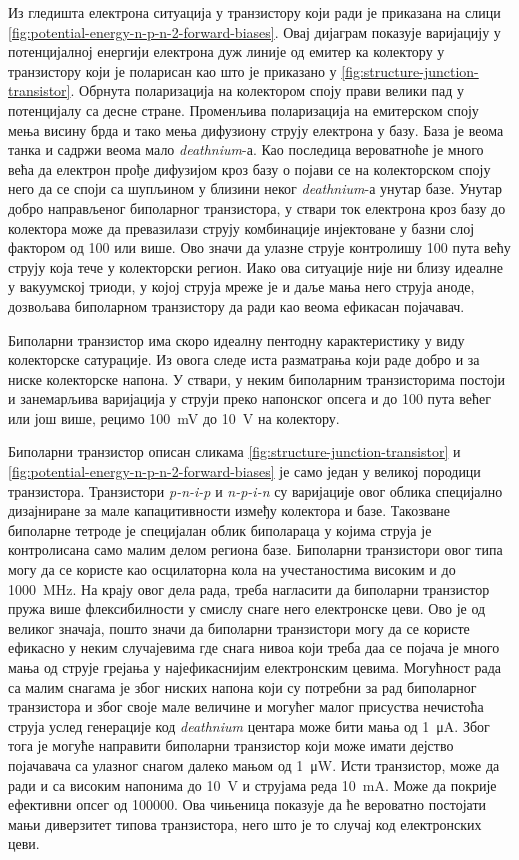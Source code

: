 \documentclass{article}
\begin{document}
Из гледишта електрона ситуација у транзистору који ради је приказана на слици \ref{fig:potential-energy-n-p-n-2-forward-biases}. Овај дијаграм показује варијацију у потенцијалној енергији електрона дуж линије од емитер ка колектору у транзистору који је поларисан као што је приказано у \ref{fig:structure-junction-transistor}. Обрнута поларизација на колектором споју прави велики пад у потенцијалу  са десне стране. Променљива поларизација на емитерском споју мења висину брда и тако мења дифузиону струју електрона у базу. База је веома танка и садржи веома мало \textit{deathnium}-а. Као последица вероватноће је много већа да електрон прође дифузијом кроз базу о појави се на колекторском споју него да се споји са шупљином у близини неког \textit{deathnium}-а унутар базе. Унутар добро направљеног биполарног транзистора, у ствари ток електрона кроз базу до колектора може да превазилази струју комбинације инјектоване у базни слој фактором од 100 или више. Ово значи да улазне струје контролишу 100 пута већу струју која тече у колекторски регион. Иако ова ситуације није ни близу идеалне у вакуумској триоди, у којој струја мреже је и даље мања него струја аноде, дозвољава биполарном транзистору да ради као веома ефикасан појачавач.

Биполарни транзистор има скоро идеалну пентодну карактеристику у виду колекторске сатурације. Из овога следе иста разматрања који раде добро и за ниске колекторске напона. У ствари, у неким биполарним транзисторима постоји и занемарљива варијација у струји преко напонског опсега и до 100 пута већег или још више, рецимо \SI{100}{\milli\volt} до \SI{10}{\volt} на колектору. 

Биполарни транзистор описан сликама \ref{fig:structure-junction-transistor} и \ref{fig:potential-energy-n-p-n-2-forward-biases} је само један у великој породици транзистора. Транзистори \textit{p-n-i-p} и \textit{n-p-i-n} су варијације овог облика специјално дизајниране за мале капацитивности између колектора и базе. Такозване биполарне тетроде је специјалан облик биполараца у којима струја је контролисана само малим делом региона базе. Биполарни транзистори овог типа могу да се користе као осцилаторна кола на учестаностима високим и до \SI{1000}{\mega\hertz}. На крају овог дела рада, треба нагласити да биполарни транзистор пружа више флексибилности у смислу снаге него електронске цеви. Ово је од великог значаја, пошто значи да биполарни транзистори могу да се користе ефикасно у неким случајевима где снага нивоа који треба даа се појача је много мања од струје грејања у најефикаснијим електронским цевима. Могућност рада са малим снагама је због ниских напона који су потребни за рад биполарног транзистора и због своје мале величине и могућег малог присуства нечистоћа струја услед генерације код \textit{deathnium} центара може бити мања од \SI{1}{\micro\ampere}. Због тога је могуће направити биполарни транзистор који може имати дејство појачавача са улазног снагом далеко мањом од  \SI{1}{\micro\watt}. Исти транзистор, може да ради и са високим напонима до \SI{10}{\volt} и струјама реда \SI{10}{\milli\ampere}. Може да покрије ефективни опсег од 100000. Ова чињеница показује да ће вероватно постојати мањи диверзитет типова транзистора, него што је то случај код електронских цеви.
\end{document}
